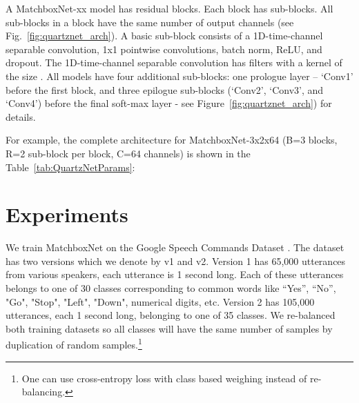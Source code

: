 \documentclass[a4paper]{article}
\begin{document}
A MatchboxNet-xx model has  residual blocks. Each block has  sub-blocks. All sub-blocks in a block have the same number of output channels  (see Fig.~\ref{fig:quartznet_arch}).
A basic sub-block consists of a 1D-time-channel separable convolution, 1x1 pointwise convolutions, batch norm, ReLU, and dropout. The 1D-time-channel separable convolution has  filters with a kernel of the size .
All models have four additional sub-blocks: one prologue layer -- `Conv1' before the first block, and three epilogue sub-blocks  (`Conv2', `Conv3', and `Conv4') before the final soft-max layer - see Figure~\ref{fig:quartznet_arch}) for details.

For example, the complete architecture for MatchboxNet-3x2x64 (B=3 blocks, R=2 sub-block per block, C=64 channels) is shown in the Table~\ref{tab:QuartzNetParams}:

{\renewcommand{\arraystretch}{1.1}
\begin{table}[!h]
\caption{MatchboxNet-3x2x64 model has B=3 blocks, each black has R=2 time-channel separable convolutional sub-blocks with C=64 channels, plus 4 additional sub-blocks: prologue - Conv1, and epilogue -  Conv2, Conv3, Conv4).}
\label{tab:QuartzNetParams}
\centering
{}
\end{table}
}

\section{Experiments}
We train MatchboxNet on the Google Speech Commands Dataset \cite{warden2018speech}. The dataset has two versions which we denote by v1 and v2. Version 1 has 65,000 utterances from various speakers, each utterance is 1 second long. Each of these utterances belongs to one of 30 classes corresponding to common words like “Yes”, “No”, "Go", "Stop", "Left", "Down", numerical digits, etc. 
Version 2 has 105,000 utterances, each 1 second long, belonging to one of 35 classes. 
We re-balanced both training datasets so all classes will have the same number of samples by duplication of random samples.\footnote{One can use cross-entropy loss with class based weighing instead of re-balancing.}
\end{document}

